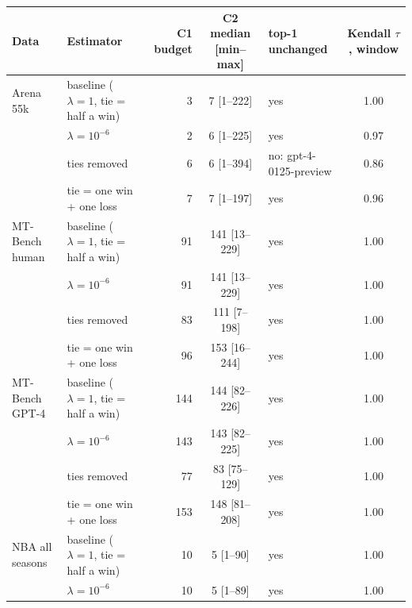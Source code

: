 \begin{tabular}{llrclc}
\toprule
Data & Estimator & C1 budget & C2 median [min--max] & top-1 unchanged & Kendall $\tau$, window \\
\midrule
Arena 55k & baseline ($\lambda=1$, tie = half a win) & 3 & 7 [1--222] & yes & 1.00 \\
 & $\lambda=10^{-6}$ & 2 & 6 [1--225] & yes & 0.97 \\
 & ties removed & 6 & 6 [1--394] & no: gpt-4-0125-preview & 0.86 \\
 & tie = one win + one loss & 7 & 7 [1--197] & yes & 0.96 \\
\midrule
MT-Bench human & baseline ($\lambda=1$, tie = half a win) & 91 & 141 [13--229] & yes & 1.00 \\
 & $\lambda=10^{-6}$ & 91 & 141 [13--229] & yes & 1.00 \\
 & ties removed & 83 & 111 [7--198] & yes & 1.00 \\
 & tie = one win + one loss & 96 & 153 [16--244] & yes & 1.00 \\
\midrule
MT-Bench GPT-4 & baseline ($\lambda=1$, tie = half a win) & 144 & 144 [82--226] & yes & 1.00 \\
 & $\lambda=10^{-6}$ & 143 & 143 [82--225] & yes & 1.00 \\
 & ties removed & 77 & 83 [75--129] & yes & 1.00 \\
 & tie = one win + one loss & 153 & 148 [81--208] & yes & 1.00 \\
\midrule
NBA all seasons & baseline ($\lambda=1$, tie = half a win) & 10 & 5 [1--90] & yes & 1.00 \\
 & $\lambda=10^{-6}$ & 10 & 5 [1--89] & yes & 1.00 \\
\bottomrule
\end{tabular}
